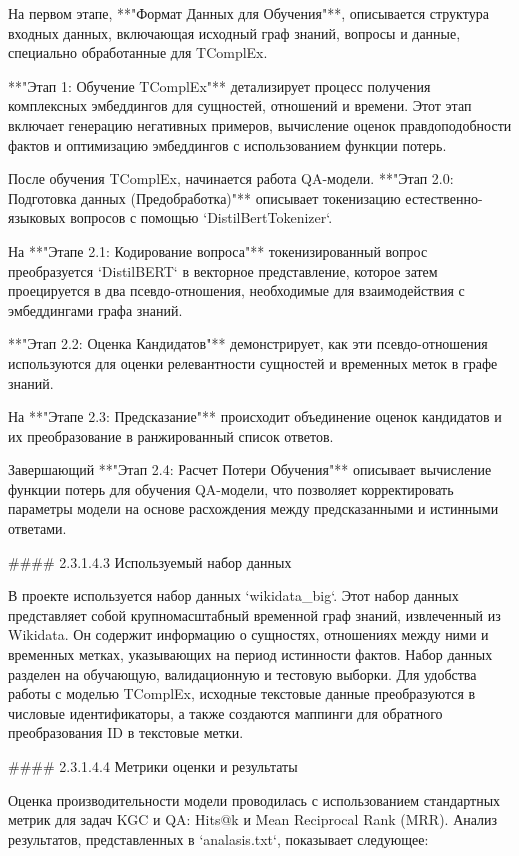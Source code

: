 \documentclass{article}
\begin{document}
На первом этапе, **"Формат Данных для Обучения"**, описывается структура входных данных, включающая исходный граф знаний, вопросы и данные, специально обработанные для TComplEx.

**"Этап 1: Обучение TComplEx"** детализирует процесс получения комплексных эмбеддингов для сущностей, отношений и времени. Этот этап включает генерацию негативных примеров, вычисление оценок правдоподобности фактов и оптимизацию эмбеддингов с использованием функции потерь.

После обучения TComplEx, начинается работа QA-модели. **"Этап 2.0: Подготовка данных (Предобработка)"** описывает токенизацию естественно-языковых вопросов с помощью `DistilBertTokenizer`.

На **"Этапе 2.1: Кодирование вопроса"** токенизированный вопрос преобразуется `DistilBERT` в векторное представление, которое затем проецируется в два псевдо-отношения, необходимые для взаимодействия с эмбеддингами графа знаний.

**"Этап 2.2: Оценка Кандидатов"** демонстрирует, как эти псевдо-отношения используются для оценки релевантности сущностей и временных меток в графе знаний.

На **"Этапе 2.3: Предсказание"** происходит объединение оценок кандидатов и их преобразование в ранжированный список ответов.

Завершающий **"Этап 2.4: Расчет Потери Обучения"** описывает вычисление функции потерь для обучения QA-модели, что позволяет корректировать параметры модели на основе расхождения между предсказанными и истинными ответами.

#### 2.3.1.4.3 Используемый набор данных

В проекте используется набор данных `wikidata_big`. Этот набор данных представляет собой крупномасштабный временной граф знаний, извлеченный из Wikidata. Он содержит информацию о сущностях, отношениях между ними и временных метках, указывающих на период истинности фактов. Набор данных разделен на обучающую, валидационную и тестовую выборки. Для удобства работы с моделью TComplEx, исходные текстовые данные преобразуются в числовые идентификаторы, а также создаются маппинги для обратного преобразования ID в текстовые метки.

#### 2.3.1.4.4 Метрики оценки и результаты

Оценка производительности модели проводилась с использованием стандартных метрик для задач KGC и QA: Hits@k и Mean Reciprocal Rank (MRR). Анализ результатов, представленных в `analasis.txt`, показывает следующее:
\end{document}
